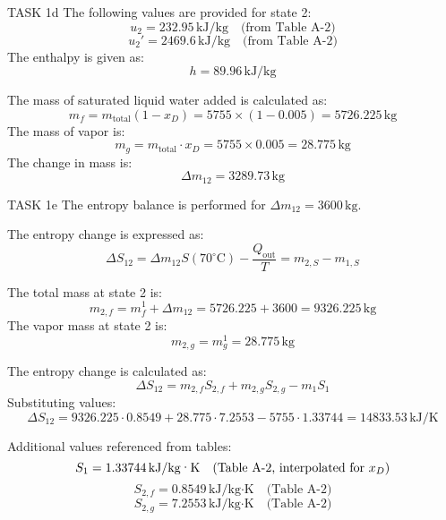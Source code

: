 TASK 1d  
The following values are provided for state 2:  
\[
u_2 = 232.95 \, \text{kJ/kg} \quad \text{(from Table A-2)}
\]  
\[
u_2' = 2469.6 \, \text{kJ/kg} \quad \text{(from Table A-2)}
\]  
The enthalpy is given as:  
\[
h = 89.96 \, \text{kJ/kg}
\]  

The mass of saturated liquid water added is calculated as:  
\[
m_f = m_{\text{total}} (1 - x_D) = 5755 \times (1 - 0.005) = 5726.225 \, \text{kg}
\]  
The mass of vapor is:  
\[
m_g = m_{\text{total}} \cdot x_D = 5755 \times 0.005 = 28.775 \, \text{kg}
\]  
The change in mass is:  
\[
\Delta m_{12} = 3289.73 \, \text{kg}
\]  

TASK 1e  
The entropy balance is performed for \( \Delta m_{12} = 3600 \, \text{kg} \).  

The entropy change is expressed as:  
\[
\Delta S_{12} = \Delta m_{12} S(70^\circ\text{C}) - \frac{Q_{\text{out}}}{T} = m_{2,S} - m_{1,S}
\]  

The total mass at state 2 is:  
\[
m_{2,f} = m_f^1 + \Delta m_{12} = 5726.225 + 3600 = 9326.225 \, \text{kg}
\]  
The vapor mass at state 2 is:  
\[
m_{2,g} = m_g^1 = 28.775 \, \text{kg}
\]  

The entropy change is calculated as:  
\[
\Delta S_{12} = m_{2,f} S_{2,f} + m_{2,g} S_{2,g} - m_1 S_1
\]  
Substituting values:  
\[
\Delta S_{12} = 9326.225 \cdot 0.8549 + 28.775 \cdot 7.2553 - 5755 \cdot 1.33744 = 14833.53 \, \text{kJ/K}
\]  

Additional values referenced from tables:  
\[
S_1 = 1.33744 \, \text{kJ/kg·K} \quad \text{(Table A-2, interpolated for \( x_D \))}
\]  
\[
S_{2,f} = 0.8549 \, \text{kJ/kg·K} \quad \text{(Table A-2)}
\]  
\[
S_{2,g} = 7.2553 \, \text{kJ/kg·K} \quad \text{(Table A-2)}
\]